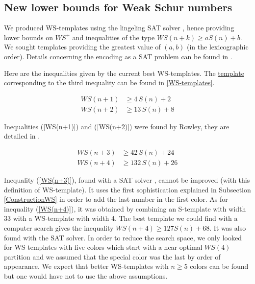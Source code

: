 \documentclass[final,onefignum,onetabnum]{siamart190516}
\newcommand{\WS}{\mathit{WS}}
\begin{document}
\subsection{New lower bounds for Weak Schur numbers}

We produced WS-templates using the lingeling SAT solver \cite{Lingeling2017}, hence providing lower bounds on \(WS^+\) 
and inequalities of the type \(WS(n+k) \geqslant a S(n) + b\). We sought templates providing the greatest value of \((a, b)\) 
(in the lexicographic order). Details concerning the encoding as a SAT problem can be found in \cite{Heule2017}.

\par
Here are the inequalities given by the current best WS-templates. The \hyperref[WS-templates]{template} 
corresponding to the third inequality can be found in \ref{WS-templates}.

\begin{align}
	WS(n + 1) &\geqslant  4\,S(n)  +  2 \label{WS(n+1)} \\
	WS(n + 2) &\geqslant  13\,S(n)  +  8 \label{WS(n+2)} 
\end{align}

Inequalities (\ref{WS(n+1)}) and (\ref{WS(n+2)}) were found by Rowley, they are detailed in \cite{RowleyWS}.

\begin{align}
	WS(n + 3) &\geqslant  42\,S(n)  +  24 \label{WS(n+3)} \\
	WS(n + 4) &\geqslant  132\,S(n)  +  26 \label{WS(n+4)}
\end{align}

Inequality (\ref{WS(n+3)}), found with a SAT solver \cite{Lingeling2017}, cannot be improved (with this 
definition of WS-template). It uses the first 
sophistication explained in Subsection \ref{ConstructionWS} in order to add
the last number in the first color. As for inequality (\ref{WS(n+4)}), it was obtained by combining an S-template with 
width 33 with a WS-template with width 4. The best template we could find with a computer search gives the 
inequality \(\WS(n+4) \geqslant 127 S(n) + 68\). It was also found with the SAT solver. In order to reduce the search space, 
we only looked for WS-templates with five colors which start with a near-optimal \(\WS(4)\) partition and we assumed that the 
special color was the last by order of appearance. We expect that better WS-templates with \(n \geqslant 5\) 
colors can be found but one would have not to use the above assumptions.
\end{document}
